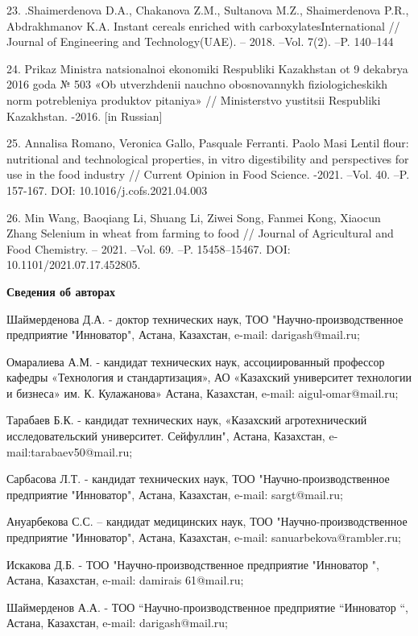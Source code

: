 23. .Shaimerdenova D.A., Chakanova Z.M., Sultanova M.Z., Shaimerdenova
P.R., Abdrakhmanov K.A. Instant cereals enriched with
carboxylatesInternational // Journal of Engineering and Technology(UAE).
-- 2018. --Vol. 7(2). --P. 140--144

24. Prikaz Ministra natsional\textquotesingle noi ekonomiki Respubliki
Kazakhstan ot 9 dekabrya 2016 goda № 503 «Ob utverzhdenii nauchno
obosnovannykh fiziologicheskikh norm potrebleniya produktov pitaniya» //
Ministerstvo yustitsii Respubliki Kazakhstan. -2016. {[}in Russian{]}

25. Annalisa Romano, Veronica Gallo, Pasquale Ferranti. Paolo Masi
Lentil flour: nutritional and technological properties, in vitro
digestibility and perspectives for use in the food industry // Current
Opinion in Food Science. -2021. --Vol. 40. --P. 157-167. DOI:
10.1016/j.cofs.2021.04.003

26. Min Wang, Baoqiang Li, Shuang Li, Ziwei Song, Fanmei Kong, Xiaocun
Zhang Selenium in wheat from farming to food // Journal of Agricultural
and Food Chemistry. -- 2021. --Vol. 69. --P. 15458--15467. DOI:
10.1101/2021.07.17.452805.

{\bfseries Сведения об авторах}

Шаймерденова Д.А. - доктор технических наук, ТОО
"Научно-производственное предприятие "Инноватор", Астана, Казахстан,
e-mail: darigash@mail.ru;

Омаралиева А.М. - кандидат технических наук, ассоциированный профессор
кафедры «Технология и стандартизация», АО «Казахский университет
технологии и бизнеса» им. К. Кулажанова» Астана, Казахстан, e-mail:
aigul-omar@mail.ru;

Тарабаев Б.К. - кандидат технических наук, «Казахский агротехнический
исследовательский университет. Сейфуллин", Астана, Казахстан,
e-mail:tarabaev50@mail.ru;

Сарбасова Л.Т. - кандидат технических наук, ТОО "Научно-производственное
предприятие "Инноватор", Астана, Казахстан, e-mail: sargt@mail.ru;

Ануарбекова С.С. -- кандидат медицинских наук, ТОО
"Научно-производственное предприятие "Инноватор", Астана, Казахстан,
e-mail: sanuarbekova@rambler.ru;

Искакова Д.Б. - ТОО "Научно-производственное предприятие "Инноватор ",
Астана, Казахстан, e-mail: damirais 61@mail.ru;

Шаймерденов А.А. - ТОО ``Научно-производственное предприятие ``Инноватор
``, Астана, Казахстан, e-mail: darigash@mail.ru;

